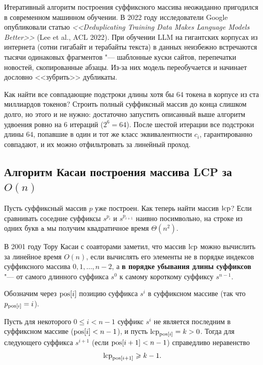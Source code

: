 \begin{note}
    Итеративный алгоритм построения суффиксного массива неожиданно пригодился в современном машинном обучении. В 2022 году исследователи Google опубликовали статью \textit{<<Deduplicating Training Data Makes Language Models Better>>} (Lee et al., ACL 2022). При обучении LLM на гигантских корпусах из интернета (сотни гигабайт и терабайты текста) в данных неизбежно встречаются тысячи одинаковых фрагментов "--- шаблонные куски сайтов, перепечатки новостей, скопированные абзацы. Из-за них модель переобучается и начинает дословно <<зубрить>> дубликаты.

    Как найти все совпадающие подстроки длины хотя бы $64$ токена в корпусе из ста миллиардов токенов? Строить полный суффиксный массив до конца слишком долго, но этого и не нужно: достаточно запустить описанный выше алгоритм удвоения ровно на $6$ итераций ($2^6 = 64$). После шестой итерации все подстроки длины $64$, попавшие в один и тот же класс эквивалентности $c_i$, гарантированно совпадают, и их можно отфильтровать за линейный проход.
\end{note}

\subsection{Алгоритм Касаи построения массива LCP за \texorpdfstring{$O(n)$}{O(n)}}

Пусть суффиксный массив $p$ уже построен. Как теперь найти массив $\operatorname{lcp}$? Если сравнивать соседние суффиксы $s^{p_i}$ и $s^{p_{i+1}}$ наивно посимвольно, на строке из одних букв $\mathtt{a}$ мы получим квадратичное время $\Theta(n^2)$.

В 2001 году Тору Касаи с соавторами заметил, что массив $\operatorname{lcp}$ можно вычислить за линейное время $O(n)$, если вычислять его элементы не в порядке индексов суффиксного массива $0, 1, \dots, n-2$, а \textbf{в порядке убывания длины суффиксов} "--- от самого длинного суффикса $s^0$ к самому короткому суффиксу $s^{n-1}$.

Обозначим через $\operatorname{pos}[i]$ позицию суффикса $s^i$ в суффиксном массиве (так что $p_{\operatorname{pos}[i]} = i$).

\begin{lemma}\label{lem:kasai}
    Пусть для некоторого $0 \le i < n - 1$ суффикс $s^i$ не является последним в суффиксном массиве ($\operatorname{pos}[i] < n - 1$), и пусть $\operatorname{lcp}_{\operatorname{pos}[i]} = k > 0$. Тогда для следующего суффикса $s^{i+1}$ (если $\operatorname{pos}[i+1] < n - 1$) справедливо неравенство
    \[
        \operatorname{lcp}_{\operatorname{pos}[i+1]} \geqslant k - 1.
    \]
\end{lemma}

